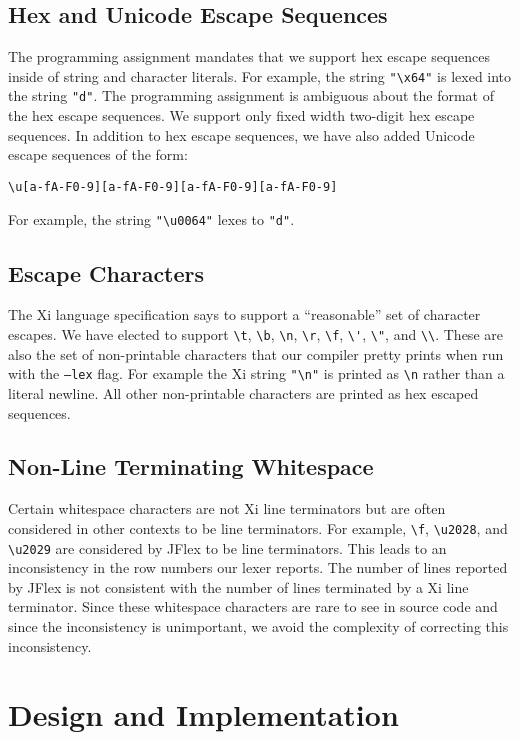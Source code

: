 \documentclass{hw}
\begin{document}
\subsection{Hex and Unicode Escape Sequences}
The programming assignment mandates that we support hex escape sequences inside
of string and character literals. For example, the string \verb$"\x64"$ is
lexed into the string \texttt{"d"}. The programming assignment is ambiguous
about the format of the hex escape sequences. We support only fixed width
two-digit hex escape sequences.
%
In addition to hex escape sequences, we have also added Unicode escape
sequences of the form:
\begin{center}
  \verb$\u[a-fA-F0-9][a-fA-F0-9][a-fA-F0-9][a-fA-F0-9]$
\end{center}
For example, the string \verb$"\u0064"$ lexes to \texttt{"d"}.

\subsection{Escape Characters}
The Xi language specification says to support a ``reasonable'' set of character
escapes. We have elected to support \verb$\t$, \verb$\b$, \verb$\n$, \verb$\r$,
\verb$\f$, \verb$\'$, \verb$\"$, and \verb$\\$. These are also the set of
non-printable characters that our compiler pretty prints when run with the
\texttt{--lex} flag. For example the Xi string \verb$"\n"$ is printed as
\verb$\n$ rather than a literal newline. All other non-printable characters are
printed as hex escaped sequences.

\subsection{Non-Line Terminating Whitespace}
Certain whitespace characters are not Xi line terminators but are often
considered in other contexts to be line terminators. For example, \verb$\f$,
\verb$\u2028$, and \verb$\u2029$ are considered by JFlex to be line
terminators.  This leads to an inconsistency in the row numbers our lexer
reports. The number of lines reported by JFlex is not consistent with the
number of lines terminated by a Xi line terminator. Since these whitespace
characters are rare to see in source code and since the inconsistency is
unimportant, we avoid the complexity of correcting this inconsistency.

\section{Design and Implementation}\label{sec:design}
\end{document}
